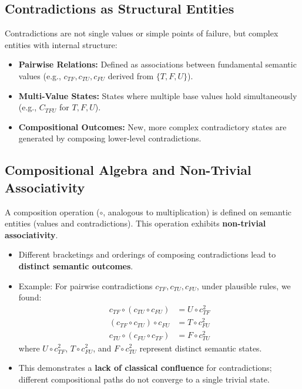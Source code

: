\documentclass{article}
\begin{document}
	\subsection{Contradictions as Structural Entities}
	Contradictions are not single values or simple points of failure, but complex entities with internal structure:
	\begin{itemize}
		\item \textbf{Pairwise Relations:} Defined as associations between fundamental semantic values (e.g., $c_{TF}, c_{TU}, c_{FU}$ derived from $\{T, F, U\}$).
		\item \textbf{Multi-Value States:} States where multiple base values hold simultaneously (e.g., $C_{TFU}$ for $T, F, U$).
		\item \textbf{Compositional Outcomes:} New, more complex contradictory states are generated by composing lower-level contradictions.
	\end{itemize}
	
	\subsection{Compositional Algebra and Non-Trivial Associativity}
	A composition operation ($\circ$, analogous to multiplication) is defined on semantic entities (values and contradictions). This operation exhibits \textbf{non-trivial associativity}.
	\begin{itemize}
		\item Different bracketings and orderings of composing contradictions lead to \textbf{distinct semantic outcomes}.
		\item Example: For pairwise contradictions $c_{TF}, c_{TU}, c_{FU}$, under plausible rules, we found:
		\begin{align*} c_{TF} \circ (c_{TU} \circ c_{FU}) &= U \circ c_{TF}^2 \\ (c_{TF} \circ c_{TU}) \circ c_{FU} &= T \circ c_{FU}^2 \\ c_{TU} \circ (c_{FU} \circ c_{TF}) &= F \circ c_{TU}^2 \end{align*}
		where $U \circ c_{TF}^2$, $T \circ c_{FU}^2$, and $F \circ c_{TU}^2$ represent distinct semantic states.
		\item This demonstrates a \textbf{lack of classical confluence} for contradictions; different compositional paths do not converge to a single trivial state.
	\end{itemize}
	
\end{document}
